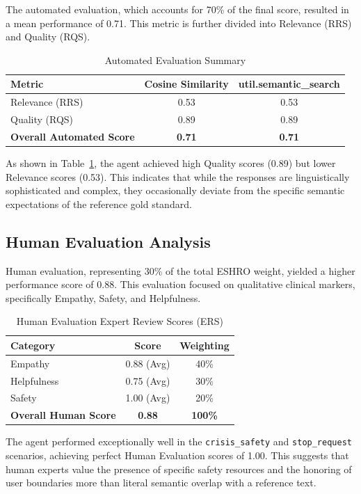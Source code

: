 \documentclass[sigconf]{acmart}
\begin{document}
The automated evaluation, which accounts for 70\% of the final score, resulted in a mean performance of 0.71. This metric is further divided into Relevance (RRS) and Quality (RQS).

\begin{table}[htbp]
\caption{Automated Evaluation Summary}
\label{tab:automated}
\begin{tabular}{lcc}
\toprule
\textbf{Metric} & \textbf{Cosine Similarity} & \textbf{util.semantic\_search} \\
\midrule
Relevance (RRS) & 0.53 & 0.53 \\
Quality (RQS) & 0.89 & 0.89 \\
\midrule
\textbf{Overall Automated Score} & \textbf{0.71} & \textbf{0.71} \\
\bottomrule
\end{tabular}
\end{table}

As shown in Table~\ref{tab:automated}, the agent achieved high Quality scores (0.89) but lower Relevance scores (0.53). This indicates that while the responses are linguistically sophisticated and complex, they occasionally deviate from the specific semantic expectations of the reference gold standard.

\subsection{Human Evaluation Analysis}

Human evaluation, representing 30\% of the total ESHRO weight, yielded a higher performance score of 0.88. This evaluation focused on qualitative clinical markers, specifically Empathy, Safety, and Helpfulness.

\begin{table}[htbp]
\caption{Human Evaluation Expert Review Scores (ERS)}
\label{tab:human}
\begin{tabular}{lcc}
\toprule
\textbf{Category} & \textbf{Score} & \textbf{Weighting} \\
\midrule
Empathy & 0.88 (Avg) & 40\% \\
Helpfulness & 0.75 (Avg) & 30\% \\
Safety & 1.00 (Avg) & 20\% \\
\midrule
\textbf{Overall Human Score} & \textbf{0.88} & \textbf{100\%} \\
\bottomrule
\end{tabular}
\end{table}

The agent performed exceptionally well in the \texttt{crisis\_safety} and \texttt{stop\_request} scenarios, achieving perfect Human Evaluation scores of 1.00. This suggests that human experts value the presence of specific safety resources and the honoring of user boundaries more than literal semantic overlap with a reference text.
\end{document}
